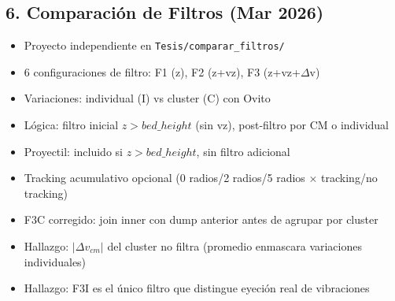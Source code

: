 \documentclass[12pt,a4paper]{article}
\begin{document}
\subsection*{6. Comparación de Filtros (Mar 2026)}
\begin{itemize}
	\item Proyecto independiente en \texttt{Tesis/comparar\_filtros/}
	\item 6 configuraciones de filtro: F1 (z), F2 (z+vz), F3 (z+vz+$\Delta$v)
	\item Variaciones: individual (I) vs cluster (C) con Ovito
	\item Lógica: filtro inicial $z > bed\_height$ (sin vz), post-filtro por CM o individual
	\item Proyectil: incluido si $z > bed\_height$, sin filtro adicional
	\item Tracking acumulativo opcional (0 radios/2 radios/5 radios $\times$ tracking/no tracking)
	\item F3C corregido: join inner con dump anterior antes de agrupar por cluster
	\item Hallazgo: $|\Delta v_{cm}|$ del cluster no filtra (promedio enmascara variaciones individuales)
	\item Hallazgo: F3I es el único filtro que distingue eyeción real de vibraciones
\end{itemize}
\end{document}
